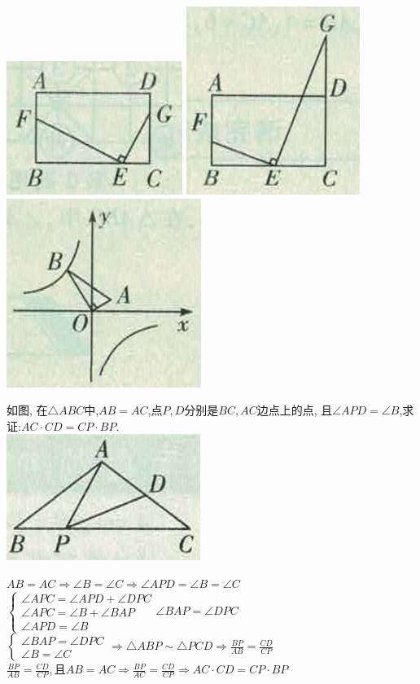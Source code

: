 \documentclass[cn,blue,12pt]{elegantbook}
\begin{document}
\begin{zsyd}
\begin{zsyd}
        \includegraphics[width=0.2\linewidth]{pic/20200514012.png}
        \includegraphics[width=0.2\linewidth]{pic/20200514013.png}
        \includegraphics[width=0.2\linewidth]{pic/20200514014.png}
    \end{zsyd}
    \begin{liti}[resume]
    \item 如图, 在\(\triangle ABC\)中,\(AB=AC\),点\(P,D\)分别是\(BC,AC\)边点上的点, 且\(\angle APD= \angle B\),求证:\(AC \cdot  CD = CP \cdot BP\).\\
        \includegraphics[width=0.2\linewidth]{pic/20200514015.png}
\begin{solution}
            \(AB=AC \Rightarrow \angle B=\angle C \Rightarrow \angle APD = \angle B=\angle C \)\\
            \(\begin{cases} \angle APC = \angle APD + \angle DPC\\ \angle APC = \angle B + \angle BAP\\ \angle APD =\angle B \end{cases}\angle BAP = \angle DPC\)\\
            \(\begin{cases} \angle BAP = \angle DPC\\ \angle B = \angle C \end{cases} \Rightarrow \triangle ABP \sim \triangle PCD \Rightarrow \frac{BP}{AB}=\frac{CD}{CP}\)\\
            \(\frac{BP}{AB}=\frac{CD}{CP},\text{且}AB=AC \Rightarrow \frac{BP}{AC}=\frac{CD}{CP}\Rightarrow AC\cdot CD = CP\cdot BP\)
\end{solution}


\end{liti}
\end{zsyd}
\end{document}
